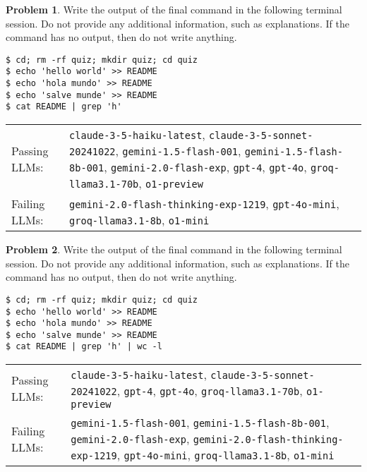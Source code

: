 \documentclass[10pt]{article}
\theoremstyle{definition}
\newtheorem{problem}{Problem}
\begin{document}
\begin{samepage}

\begin{problem}
Write the output of the final command in the following terminal session.
Do not provide any additional information,
such as explanations.
If the command has no output,
then do not write anything.

\end{problem}
\begin{lstlisting}
$ cd; rm -rf quiz; mkdir quiz; cd quiz
$ echo 'hello world' >> README
$ echo 'hola mundo' >> README
$ echo 'salve munde' >> README
$ cat README | grep 'h'
\end{lstlisting}


\noindent
\begin{tabular}{p{1.0in}L{5in}}
Passing LLMs: & {\lstinline$claude-3-5-haiku-latest$}, {\lstinline$claude-3-5-sonnet-20241022$}, {\lstinline$gemini-1.5-flash-001$}, {\lstinline$gemini-1.5-flash-8b-001$}, {\lstinline$gemini-2.0-flash-exp$}, {\lstinline$gpt-4$}, {\lstinline$gpt-4o$}, {\lstinline$groq-llama3.1-70b$}, {\lstinline$o1-preview$} \\
Failing LLMs: & {\lstinline$gemini-2.0-flash-thinking-exp-1219$}, {\lstinline$gpt-4o-mini$}, {\lstinline$groq-llama3.1-8b$}, {\lstinline$o1-mini$} \\
\end{tabular}

\end{samepage}
\begin{samepage}

\begin{problem}
Write the output of the final command in the following terminal session.
Do not provide any additional information,
such as explanations.
If the command has no output,
then do not write anything.

\end{problem}
\begin{lstlisting}
$ cd; rm -rf quiz; mkdir quiz; cd quiz
$ echo 'hello world' >> README
$ echo 'hola mundo' >> README
$ echo 'salve munde' >> README
$ cat README | grep 'h' | wc -l
\end{lstlisting}


\noindent
\begin{tabular}{p{1.0in}L{5in}}
Passing LLMs: & {\lstinline$claude-3-5-haiku-latest$}, {\lstinline$claude-3-5-sonnet-20241022$}, {\lstinline$gpt-4$}, {\lstinline$gpt-4o$}, {\lstinline$groq-llama3.1-70b$}, {\lstinline$o1-preview$} \\
Failing LLMs: & {\lstinline$gemini-1.5-flash-001$}, {\lstinline$gemini-1.5-flash-8b-001$}, {\lstinline$gemini-2.0-flash-exp$}, {\lstinline$gemini-2.0-flash-thinking-exp-1219$}, {\lstinline$gpt-4o-mini$}, {\lstinline$groq-llama3.1-8b$}, {\lstinline$o1-mini$} \\
\end{tabular}

\end{samepage}
\end{document}
